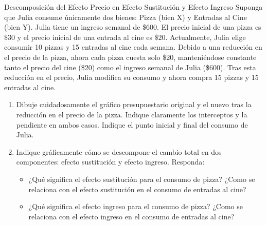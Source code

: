 \documentclass{beamer}
\begin{document}
\begin{frame}{Descomposición del Efecto Precio en Efecto Sustitución y Efecto Ingreso}
    \scriptsize
    Suponga que Julia consume únicamente dos bienes: Pizza (bien X) y Entradas al Cine (bien Y). Julia tiene un ingreso semanal de \$600. El precio inicial de una pizza es \$30 y el precio inicial de una entrada al cine es \$20. Actualmente, Julia elige consumir 10 pizzas y 15 entradas al cine cada semana.
    Debido a una reducción en el precio de la pizza, ahora cada pizza cuesta solo \$20, manteniéndose constante tanto el precio del cine (\$20) como el ingreso semanal de Julia (\$600). Tras esta reducción en el precio, Julia modifica su consumo y ahora compra 15 pizzas y 15 entradas al cine.
    \begin{enumerate}
        \item Dibuje cuidadosamente el gráfico presupuestario original y el nuevo tras la reducción en el precio de la pizza. Indique claramente los interceptos y la pendiente en ambos casos. Indique el punto inicial y final del consumo de Julia.
        \item Indique gráficamente cómo se descompone el cambio total en dos componentes: efecto sustitución y efecto ingreso. Responda:
        \begin{itemize}
            \scriptsize
            \item ¿Qué significa el efecto sustitución para el consumo de pizza? ¿Como se relaciona con el efecto sustitución en el consumo de entradas al cine?
            \item ¿Qué significa el efecto ingreso para el consumo de pizza? ¿Como se relaciona con el efecto ingreso en el consumo de entradas al cine?
        \end{itemize}
    \end{enumerate}
\end{frame}
\end{document}
